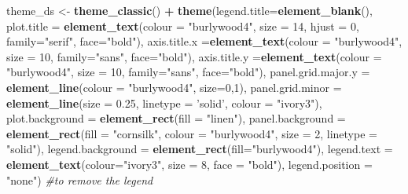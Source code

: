 \documentclass[
]{article}
\newenvironment{Shaded}{\begin{snugshade}}{\end{snugshade}}
\newcommand{\CommentTok}[1]{\textcolor[rgb]{0.56,0.35,0.01}{\textit{#1}}}
\newcommand{\DataTypeTok}[1]{\textcolor[rgb]{0.13,0.29,0.53}{#1}}
\newcommand{\DecValTok}[1]{\textcolor[rgb]{0.00,0.00,0.81}{#1}}
\newcommand{\FloatTok}[1]{\textcolor[rgb]{0.00,0.00,0.81}{#1}}
\newcommand{\KeywordTok}[1]{\textcolor[rgb]{0.13,0.29,0.53}{\textbf{#1}}}
\newcommand{\NormalTok}[1]{#1}
\newcommand{\OperatorTok}[1]{\textcolor[rgb]{0.81,0.36,0.00}{\textbf{#1}}}
\newcommand{\StringTok}[1]{\textcolor[rgb]{0.31,0.60,0.02}{#1}}
\begin{document}
\begin{Shaded}
\begin{Highlighting}[]
\NormalTok{theme_ds <-}\StringTok{ }\KeywordTok{theme_classic}\NormalTok{() }\OperatorTok{+}
\StringTok{  }\KeywordTok{theme}\NormalTok{(}\DataTypeTok{legend.title=}\KeywordTok{element_blank}\NormalTok{(), }
        \DataTypeTok{plot.title =} \KeywordTok{element_text}\NormalTok{(}\DataTypeTok{colour =} \StringTok{"burlywood4"}\NormalTok{, }\DataTypeTok{size =} \DecValTok{14}\NormalTok{, }\DataTypeTok{hjust =} \DecValTok{0}\NormalTok{, }\DataTypeTok{family=}\StringTok{"serif"}\NormalTok{, }\DataTypeTok{face=}\StringTok{"bold"}\NormalTok{),}
        \DataTypeTok{axis.title.x =}\KeywordTok{element_text}\NormalTok{(}\DataTypeTok{colour =} \StringTok{"burlywood4"}\NormalTok{, }\DataTypeTok{size =} \DecValTok{10}\NormalTok{, }\DataTypeTok{family=}\StringTok{"sans"}\NormalTok{, }\DataTypeTok{face=}\StringTok{"bold"}\NormalTok{),}
        \DataTypeTok{axis.title.y =}\KeywordTok{element_text}\NormalTok{(}\DataTypeTok{colour =} \StringTok{"burlywood4"}\NormalTok{, }\DataTypeTok{size =} \DecValTok{10}\NormalTok{, }\DataTypeTok{family=}\StringTok{"sans"}\NormalTok{, }\DataTypeTok{face=}\StringTok{"bold"}\NormalTok{), }
        \DataTypeTok{panel.grid.major.y =} \KeywordTok{element_line}\NormalTok{(}\DataTypeTok{colour =} \StringTok{"burlywood4"}\NormalTok{, }\DataTypeTok{size=}\DecValTok{0}\NormalTok{,}\DecValTok{1}\NormalTok{),}
        \DataTypeTok{panel.grid.minor =} \KeywordTok{element_line}\NormalTok{(}\DataTypeTok{size =} \FloatTok{0.25}\NormalTok{, }\DataTypeTok{linetype =} \StringTok{'solid'}\NormalTok{, }\DataTypeTok{colour =} \StringTok{"ivory3"}\NormalTok{),}
        \DataTypeTok{plot.background =} \KeywordTok{element_rect}\NormalTok{(}\DataTypeTok{fill =} \StringTok{"linen"}\NormalTok{),}
        \DataTypeTok{panel.background =} \KeywordTok{element_rect}\NormalTok{(}\DataTypeTok{fill =} \StringTok{"cornsilk"}\NormalTok{, }\DataTypeTok{colour =} \StringTok{"burlywood4"}\NormalTok{,}
                                        \DataTypeTok{size =} \DecValTok{2}\NormalTok{, }\DataTypeTok{linetype =} \StringTok{"solid"}\NormalTok{),}
        \DataTypeTok{legend.background =} \KeywordTok{element_rect}\NormalTok{(}\DataTypeTok{fill=}\StringTok{"burlywood4"}\NormalTok{), }
        \DataTypeTok{legend.text =} \KeywordTok{element_text}\NormalTok{(}\DataTypeTok{colour=}\StringTok{"ivory3"}\NormalTok{, }\DataTypeTok{size =} \DecValTok{8}\NormalTok{, }\DataTypeTok{face =} \StringTok{"bold"}\NormalTok{),}
        \DataTypeTok{legend.position =} \StringTok{"none"}\NormalTok{) }\CommentTok{#to remove the legend}


\end{Highlighting}
\end{Shaded}
\end{document}
